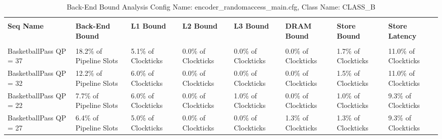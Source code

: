 \documentclass{article}%
\begin{document}
\begin{longtabu}{| X[l] | X[l] | X[l] | X[l] | X[l] | X[l] | X[l] | X[l] |}%
\caption{%
Back{-}End Bound Analysis\newline%
 Config Name: encoder\_randomaccess\_main.cfg,\newline%
 Class Name: CLASS\_B\newline%
%
}%
\hline%
&&&&&&&\\%
\textbf{Seq Name}&\textbf{Back{-}End Bound}&\textbf{L1 Bound}&\textbf{L2 Bound}&\textbf{L3 Bound}&\textbf{DRAM Bound}&\textbf{Store Bound}&\textbf{Store Latency}\\%
&&&&&&&\\%
\hline%
\endhead%
BasketballPass\newline%
 QP = 37&18.2\% of Pipeline Slots&5.1\% of Clockticks&0.0\% of Clockticks&0.0\% of Clockticks&0.0\% of Clockticks&1.7\% of Clockticks&11.0\% of Clockticks\\%
\hline%
BasketballPass\newline%
 QP = 32&12.2\% of Pipeline Slots&6.0\% of Clockticks&0.0\% of Clockticks&0.0\% of Clockticks&0.0\% of Clockticks&1.5\% of Clockticks&11.0\% of Clockticks\\%
\hline%
BasketballPass\newline%
 QP = 22&7.7\% of Pipeline Slots&6.0\% of Clockticks&0.0\% of Clockticks&1.0\% of Clockticks&0.0\% of Clockticks&1.0\% of Clockticks&9.3\% of Clockticks\\%
\hline%
BasketballPass\newline%
 QP = 27&6.4\% of Pipeline Slots&5.0\% of Clockticks&0.0\% of Clockticks&0.0\% of Clockticks&1.3\% of Clockticks&1.3\% of Clockticks&9.3\% of Clockticks\\%
\hline%
\end{longtabu}%
\newpage

%
\end{document}
